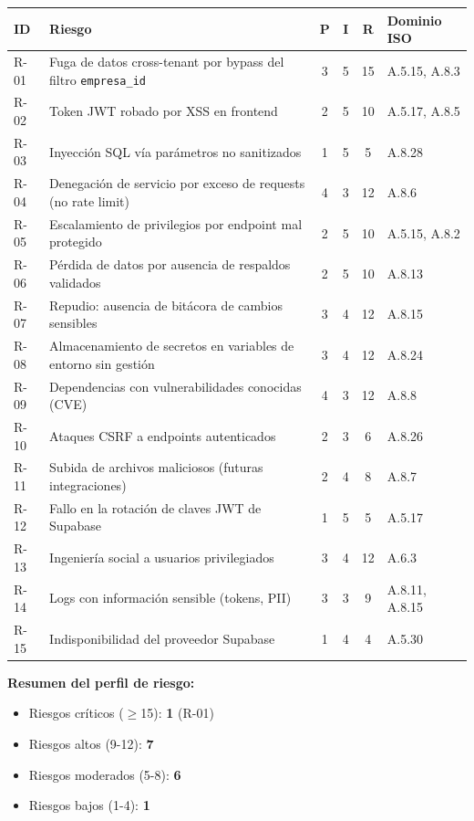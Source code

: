 \documentclass[12pt,a4paper,oneside]{article}
\begin{document}
\begin{longtable}{p{1.2cm}p{5cm}cccp{2.5cm}}
\toprule
\textbf{ID} & \textbf{Riesgo} & \textbf{P} & \textbf{I} & \textbf{R} & \textbf{Dominio ISO} \\
\midrule
\endhead
R-01 & Fuga de datos cross-tenant por bypass del filtro \texttt{empresa\_id} & 3 & 5 & \cellcolor{danger!50}15 & A.5.15, A.8.3 \\
R-02 & Token JWT robado por XSS en frontend & 2 & 5 & \cellcolor{warning!70}10 & A.5.17, A.8.5 \\
R-03 & Inyección SQL vía parámetros no sanitizados & 1 & 5 & \cellcolor{warning!50}5 & A.8.28 \\
R-04 & Denegación de servicio por exceso de requests (no rate limit) & 4 & 3 & \cellcolor{warning!70}12 & A.8.6 \\
R-05 & Escalamiento de privilegios por endpoint mal protegido & 2 & 5 & \cellcolor{warning!70}10 & A.5.15, A.8.2 \\
R-06 & Pérdida de datos por ausencia de respaldos validados & 2 & 5 & \cellcolor{warning!70}10 & A.8.13 \\
R-07 & Repudio: ausencia de bitácora de cambios sensibles & 3 & 4 & \cellcolor{warning!70}12 & A.8.15 \\
R-08 & Almacenamiento de secretos en variables de entorno sin gestión & 3 & 4 & \cellcolor{warning!70}12 & A.8.24 \\
R-09 & Dependencias con vulnerabilidades conocidas (CVE) & 4 & 3 & \cellcolor{warning!70}12 & A.8.8 \\
R-10 & Ataques CSRF a endpoints autenticados & 2 & 3 & \cellcolor{warning!50}6 & A.8.26 \\
R-11 & Subida de archivos maliciosos (futuras integraciones) & 2 & 4 & \cellcolor{warning!50}8 & A.8.7 \\
R-12 & Fallo en la rotación de claves JWT de Supabase & 1 & 5 & \cellcolor{warning!50}5 & A.5.17 \\
R-13 & Ingeniería social a usuarios privilegiados & 3 & 4 & \cellcolor{warning!70}12 & A.6.3 \\
R-14 & Logs con información sensible (tokens, PII) & 3 & 3 & \cellcolor{warning!50}9 & A.8.11, A.8.15 \\
R-15 & Indisponibilidad del proveedor Supabase & 1 & 4 & \cellcolor{success!50}4 & A.5.30 \\
\bottomrule
\end{longtable}

\textbf{Resumen del perfil de riesgo:}
\begin{itemize}[leftmargin=*]
  \item Riesgos críticos ($\geq$15): \textbf{1} (R-01)
  \item Riesgos altos (9-12): \textbf{7}
  \item Riesgos moderados (5-8): \textbf{6}
  \item Riesgos bajos (1-4): \textbf{1}
\end{itemize}
\end{document}
